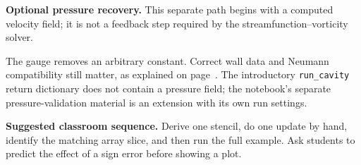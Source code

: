\textbf{Optional pressure recovery.} This separate path begins with a computed velocity field; it is not a feedback step required by the streamfunction--vorticity solver.
\begin{center}
\end{center}
The gauge removes an arbitrary constant. Correct wall data and Neumann compatibility still matter, as explained on page~\pageref{sec:pressure-proof}. The introductory \texttt{run\_cavity} return dictionary does not contain a pressure field; the notebook's separate pressure-validation material is an extension with its own run settings.

\textbf{Suggested classroom sequence.} Derive one stencil, do one update by hand, identify the matching array slice, and then run the full example. Ask students to predict the effect of a sign error before showing a plot.
